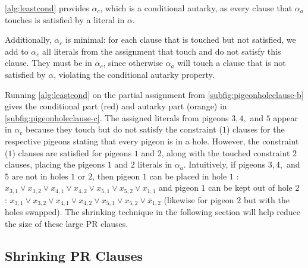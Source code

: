 \autoref{alg:leastcond} provides $\alpha_c$, which is a conditional autarky, as every
clause that $\alpha_a$ touches is
satisfied by a literal in $\alpha$.

Additionally, $\alpha_c$ is minimal: for each clause that is touched but not
satisfied, we add to $\alpha_c$ all literals from the assignment that touch and do
not satisfy this clause. They must be in $\alpha_c$, since otherwise $\alpha_a$
will touch a clause that is not satisfied by $\alpha$, violating the conditional
autarky property.

Running \autoref{alg:leastcond} on the partial assignment from \autoref{subfig:pigeonholeclause-b}  
gives the conditional part (red) and autarky part (orange) in \autoref{subfig:pigeonholeclause-c}. 
The assigned literals from pigeons $3,4,$ and $5$ appear in $\alpha_c$ because they touch 
but do not satisfy the constraint ($1$) clauses for the respective pigeons stating that every pigeon is in a hole. 
However, the constraint ($1$) clauses are satisfied for pigeons $1$ and $2$, 
along with the touched constraint $2$ clauses, placing the pigeons $1$ and $2$ literals in $\alpha_a$. 
Intuitively, if pigeons $3,4,$ and $5$ are not in holes $1$ or $2$, then pigeon $1$ can be placed in hole $1$ : 
$x_{3,1} \lor x_{3,2} \lor x_{4,1} \lor x_{4,2} \lor x_{5,1} \lor x_{5,2} \lor x_{1,1} $ and pigeon $1$ can be kept out of hole $2$ :
$x_{3,1} \lor x_{3,2} \lor x_{4,1} \lor x_{4,2} \lor x_{5,1} \lor x_{5,2} \lor \overline{x}_{1,2} $ (likewise for pigeon $2$ but with the holes swapped). 
The shrinking technique in the following section will help reduce the size of these large PR clauses. 



\subsection{Shrinking PR Clauses}~\label{subsec:shrinking}

